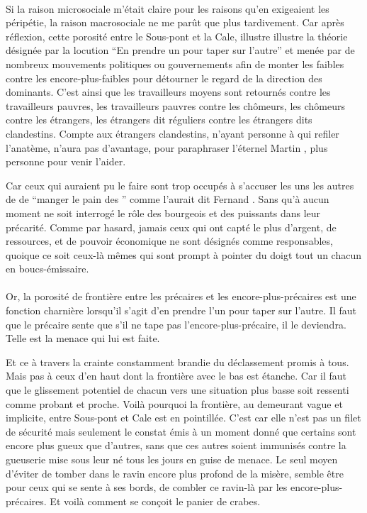 \paragraph{}
Si la raison microsociale  m’était claire pour les raisons qu’en exigeaient les péripétie, la raison macrosociale ne me parût que plus tardivement.
Car après réflexion, cette porosité entre le Sous-pont et la Cale, illustre
 illustre la théorie désignée par la locution \enquote{En prendre un pour taper sur l’autre} et menée par de nombreux mouvements politiques ou gouvernements afin de monter les faibles contre les encore-plus-faibles pour détourner le regard de la direction des dominants. C’est ainsi que les travailleurs moyens sont retournés contre les travailleurs pauvres, les travailleurs pauvres  contre les chômeurs, les chômeurs contre les étrangers, les étrangers  dit réguliers contre les étrangers dits clandestins.
 Compte aux étrangers clandestins, n’ayant personne à qui refiler l’anatème, n’aura pas d’avantage, pour paraphraser l’éternel Martin , plus personne pour venir l’aider.

Car ceux qui auraient pu le faire sont trop occupés à  s’accuser les uns les autres de  de \enquote{manger le pain des } comme l’aurait dit Fernand . Sans qu’à aucun moment ne soit interrogé le rôle des bourgeois et des puissants dans leur précarité. Comme par hasard, jamais ceux qui ont capté le plus d’argent, de ressources, et de pouvoir économique ne sont désignés comme responsables, quoique ce soit ceux-là mêmes qui sont prompt à pointer du doigt tout un chacun en boucs-émissaire.

\paragraph{}
Or, la porosité de frontière entre les précaires et les encore-plus-précaires est une fonction charnière lorsqu’il s’agit d’en prendre l’un pour taper sur l’autre.
Il faut que le précaire sente que s’il ne tape pas l’encore-plus-précaire, il le deviendra. Telle est la menace qui lui est faite.

Et ce à travers la crainte constamment brandie du déclassement promis à tous. Mais pas à ceux d’en haut dont la frontière avec le bas est étanche. Car il faut que le glissement potentiel de chacun vers une situation plus basse soit ressenti comme probant et proche. Voilà pourquoi la frontière, au demeurant vague et implicite, entre Sous-pont et Cale est en pointillée. C’est car elle n’est pas un filet de sécurité mais seulement le constat émis à un moment donné que certains sont encore plus gueux que d’autres, sans que ces autres soient immunisés contre la gueuserie mise sous leur né tous les jours en guise de menace. Le seul moyen d’éviter de tomber dans le ravin encore plus profond de la misère, semble être pour ceux qui se sente à ses bords, de combler ce ravin-là par les encore-plus-précaires. Et voilà comment se conçoit le panier de crabes.

